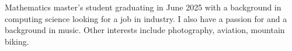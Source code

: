 Mathematics master's student graduating in June 2025 with a background in
computing science looking for a job in industry.
I also have a passion for and a background in music.
Other interests include photography, aviation, mountain biking.
